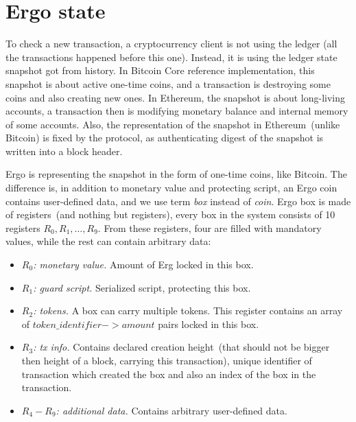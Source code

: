 \section{Ergo state}
\label{sec:utxo}


To check a new transaction, a cryptocurrency client is not using the ledger (all the transactions happened before this
one). Instead, it is using the ledger state snapshot got from history. In Bitcoin Core reference implementation,
this snapshot is about active one-time coins, and a transaction is destroying some coins and also creating new ones.
In Ethereum, the snapshot is about long-living accounts, a transaction then is modifying monetary balance and internal memory of some accounts. Also, the
representation of the snapshot in Ethereum~(unlike Bitcoin) is fixed by the protocol, as authenticating digest of the
snapshot is written into a block header.

Ergo is representing the snapshot in the form of one-time coins, like Bitcoin. The difference is, in addition to monetary
value and protecting script, an Ergo coin contains user-defined data, and we use term {\em box} instead of {\em coin}.
Ergo box is made of registers~(and nothing but registers), every box in the system consists of 10 registers $R_0,R_1,\ldots,R_9$.
From these registers, four are filled with mandatory values, while the rest can contain arbitrary data:


\begin{itemize}
    \item{\em $R_0$: monetary value. } Amount of Erg locked in this box.
    \item{\em $R_1$: guard script. } Serialized script, protecting this box.
    \item{\em $R_2$: tokens. } A box can carry multiple tokens. This register contains an array of
    $token\_identifier -> amount$ pairs locked in this box.
    \item{\em $R_3$: tx info. } Contains declared creation height~(that should not be bigger then height of a block, carrying this transaction),
    unique identifier of transaction which created the box and also an index of the box in the transaction.
    \item{\em $R_4-R_9$: additional data. } Contains arbitrary user-defined data.
\end{itemize}


